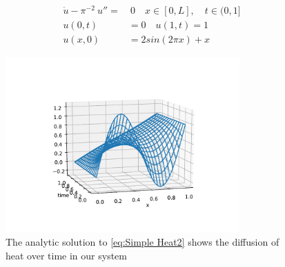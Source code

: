 \documentclass{uonmathreport}
\theoremstyle{definition}
\theoremstyle{problem}
\theoremstyle{theorem}
\begin{document}
 

\begin{subequations} 
\begin{align}\label{eq:Simple Heat2}
  \dot{u} - \pi^{-2} \: u'' = &\: 0 \quad x \in [0, L], \quad t \in (0, 1] \\ 
  u(0, t) & = 0  \quad u(1, t) = 1\\
  u(x, 0) & =  2sin(2 \pi x) +x
\end{align}
\end{subequations}

\begin{figure}[h!]
\caption{The analytic solution to \ref{eq:Simple Heat2} shows the diffusion of heat over time in our system}
 \label{fig:Heat2}
   \includegraphics[width=0.8\textwidth]{Heat2.pdf}
\end{figure}
\end{document}
